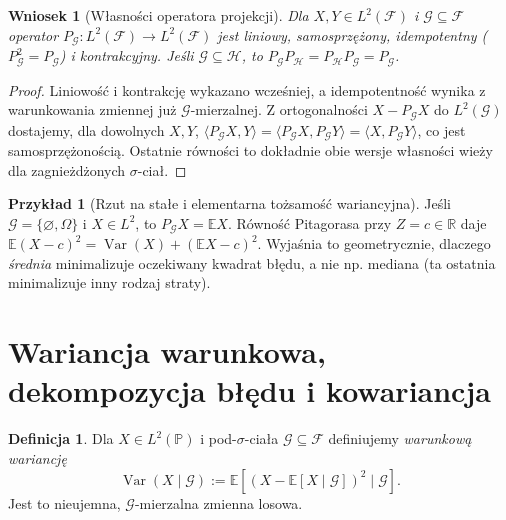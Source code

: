 \documentclass[11pt,a4paper,oneside]{report}
\numberwithin{equation}{chapter}
\theoremstyle{plain}
\newtheorem{wniosek}[twierdzenie]{Wniosek}
\theoremstyle{definition}
\newtheorem{definicja}{Definicja}[chapter]
\newtheorem{przyklad}{Przykład}[chapter]
\theoremstyle{remark}
\newcommand{\R}{\mathbb{R}}
\newcommand{\Prob}{\mathbb{P}}
\newcommand{\E}{\mathbb{E}}
\newcommand{\Var}{\operatorname{Var}}
\begin{document}
\begin{wniosek}[Własności operatora projekcji]
Dla $X,Y\in L^2(\mathcal F)$ i
$\mathcal G\subseteq\mathcal F$ operator
$P_{\mathcal G}:L^2(\mathcal F)\to L^2(\mathcal F)$
jest liniowy, samosprzężony, idempotentny
($P_{\mathcal G}^2=P_{\mathcal G}$) i kontrakcyjny.
Jeśli $\mathcal G\subseteq\mathcal H$, to
$P_{\mathcal G}P_{\mathcal H}
=P_{\mathcal H}P_{\mathcal G}=P_{\mathcal G}$.
\end{wniosek}
\begin{proof}
Liniowość i kontrakcję wykazano wcześniej,
a idempotentność wynika z warunkowania zmiennej
już $\mathcal G$-mierzalnej. Z ortogonalności
$X-P_{\mathcal G}X$ do $L^2(\mathcal G)$
dostajemy, dla dowolnych $X,Y$,
$\langle P_{\mathcal G}X,Y\rangle
=\langle P_{\mathcal G}X,P_{\mathcal G}Y\rangle
=\langle X,P_{\mathcal G}Y\rangle$,
co jest samosprzężonością.
Ostatnie równości to dokładnie obie wersje
własności wieży dla zagnieżdżonych $\sigma$-ciał.
\end{proof}

\begin{przyklad}[Rzut na stałe i elementarna tożsamość wariancyjna]
Jeśli $\mathcal G=\{\varnothing,\Omega\}$ i $X\in L^2$,
to $P_{\mathcal G}X=\E X$. Równość Pitagorasa
przy $Z=c\in\R$ daje
$\E(X-c)^2=\Var(X)+(\E X-c)^2$.
Wyjaśnia to geometrycznie, dlaczego \emph{średnia}
minimalizuje oczekiwany kwadrat błędu, a nie np.
mediana (ta ostatnia minimalizuje inny rodzaj straty).
\end{przyklad}

\section{Wariancja warunkowa, dekompozycja błędu i kowariancja}

\begin{definicja}
Dla $X\in L^2(\Prob)$ i pod-$\sigma$-ciała
$\mathcal G\subseteq\mathcal F$ definiujemy
\emph{warunkową wariancję}
\[
\Var(X\mid\mathcal G)
:=\E[(X-\E[X\mid\mathcal G])^2\mid\mathcal G].
\]
Jest to nieujemna, $\mathcal G$-mierzalna
zmienna losowa.
\end{definicja}
\end{document}
